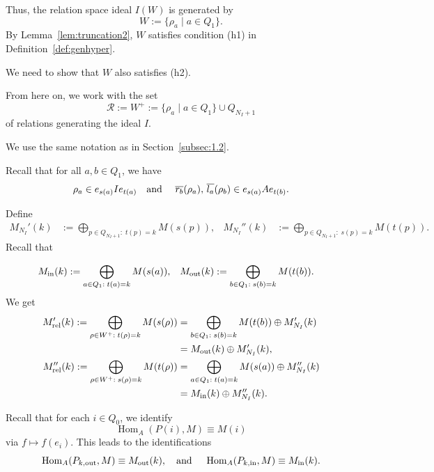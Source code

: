 \documentclass[12pt,reqno]{amsart}
\theoremstyle{definition}
\newcommand{\scL}{{\mathscr L}}
\newcommand{\scR}{{\mathscr R}}
\newcommand{\cR}{{\mathcal R}}
\newcommand{\rad}{\operatorname{rad}}
\newcommand{\Hom}{\operatorname{Hom}}
\begin{document}
Thus, the relation space ideal $I(W)$ is generated by
$$
W := \{ \rho_a \mid a \in Q_1 \}.
$$
By Lemma~\ref{lem:truncation2},
$W$ satisfies condition (h1) in Definition~\ref{def:genhyper}.

We need to show that $W$ also satisfies (h2).

From here on, we work with the set 
$$
\cR := W^+ := \{ \rho_a \mid a \in Q_1 \} \cup Q_{N_I+1}
$$
of relations generating the ideal $I$.

We use the same notation as in Section~\ref{subsec:1.2}.


Recall that for all $a,b \in Q_1$, we have 
$$
\rho_a \in e_{s(a)} I e_{t(a)}
\text{\quad and \quad}
\overline{r_b}(\rho_a),\, \overline{l_a}(\rho_b)
\in e_{s(a)}Ae_{t(b)}.
$$

Define
\begin{align*}
M_{N_I}'(k)&:= \bigoplus_{p \in Q_{N_I+1} :\; t(p) = k} M(s(p)),
&
M_{N_I}''(k) &:= \bigoplus_{p \in Q_{N_I+1} :\; s(p) = k} M(t(p)).
\end{align*}
Recall that

\begin{align*}
M_{\rm in}(k)
&:= \bigoplus_{a \in Q_1 : \; t(a)=k} M(s(a)),
&
M_{\rm out}(k)
&:= \bigoplus_{b \in Q_1 : \; s(b)=k} M(t(b)).
\end{align*}
We get
\begin{align*}
M_{\rm rel}'(k)
:= \bigoplus_{\rho \in W^+ : \; t(\rho)=k} M(s(\rho))
&= \bigoplus_{b \in Q_1 :\; s(b) = k} M(t(b)) 
\oplus M_{N_I}'(k)
\\
&= M_{\rm out}(k) \oplus M_{N_I}'(k),
\\
M_{\rm rel}''(k)
:= \bigoplus_{\rho \in W^+ : \; s(\rho)=k} M(t(\rho))
&= \bigoplus_{a \in Q_1 : \; t(a)=k} M(s(a)) \oplus M_{N_I}''(k)
\\
&= M_{\rm in}(k) \oplus M_{N_I}''(k).
\end{align*}


Recall that for each $i \in Q_0$, we identify
$$
\Hom_A(P(i),M) \equiv M(i)
$$ via $f \mapsto f(e_i)$.
This leads to the identifications
$$
\Hom_A(P_{k,{\rm out}},M) \equiv M_{\rm out}(k),
\text{\quad and \quad}
\Hom_A(P_{k,{\rm in}},M) \equiv M_{\rm in}(k).
$$
\end{document}
